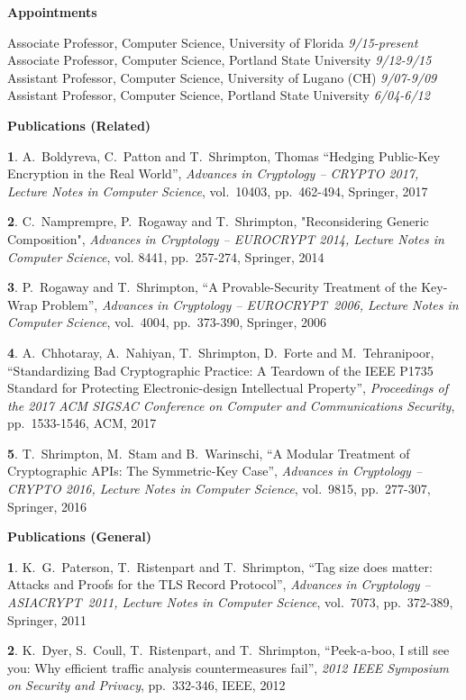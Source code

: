 \documentclass{article}[11pt]
\newcommand{\drop}{\protect{\vspace{1.2ex}}}
\newlength{\headwidth}
\newlength{\sepwidth}
\newlength{\itemwidth}
\newcommand{\resitem}[2]{\noindent\vspace{.15in}\parbox[t]{\headwidth}{\bf{#1}}\hspace{\sepwidth}\parbox[t]{\itemwidth}{#2}}
\newcommand{\pf}{\it}
\begin{document}
\begin{noindent}
\newcommand{\num}[1]{{\textbf{#1}.}}

\vspace{-2ex}

\resitem{Appointments}
{
Associate Professor, Computer Science, University of Florida
\hfill {\it 9/15-present}\\
Associate Professor, Computer Science, Portland State University
\hfill {\it 9/12-9/15}\\
Assistant Professor, Computer Science, University of Lugano (CH)
\hfill {\it 9/07-9/09} \\
Assistant Professor, Computer Science, Portland State University
\hfill {\it 6/04-6/12}
}

\resitem{Publications (Related)}
{
\num{1}
A.\ Boldyreva, C.\ Patton and T.\ Shrimpton, Thomas ``Hedging Public-Key Encryption in the Real World'',
{\pf Advances in Cryptology -- CRYPTO 2017, Lecture Notes in Computer
  Science}, vol.\ 10403, pp.\ 462-494, Springer, 2017

\drop
\num{2}
C.\ Namprempre, P.\ Rogaway and T.\ Shrimpton, "Reconsidering Generic Composition",
 {\pf Advances in Cryptology -- EUROCRYPT 2014, Lecture Notes in
   Computer Science}, vol. 8441, pp.\ 257-274, Springer, 2014


\drop
\num{3}
P.\ Rogaway and T.\ Shrimpton, ``A Provable-Security Treatment of the
Key-Wrap Problem'', {\pf Advances in Cryptology -- EUROCRYPT~2006,
Lecture Notes in Computer Science}, vol.\ 4004, pp.\ 373-390,
Springer, 2006

\drop
\num{4}
A.\ Chhotaray, A.\ Nahiyan, T.\ Shrimpton, D.\ Forte and M.\
Tehranipoor, ``Standardizing Bad Cryptographic Practice: {A} Teardown of the {IEEE
    P1735} Standard for Protecting Electronic-design Intellectual Property'',
 {\pf Proceedings of the 2017 ACM SIGSAC Conference on Computer and
    Communications Security}, pp.\ 1533-1546, ACM, 2017

\drop
\num{5}
T.\ Shrimpton, M.\ Stam and B.\ Warinschi,
``A Modular Treatment of Cryptographic APIs: The Symmetric-Key Case'',
{\pf Advances in Cryptology -- CRYPTO 2016, Lecture Notes in Computer
  Science}, vol.\ 9815, pp.\ 277-307, Springer, 2016
}


\resitem{Publications (General)}{
\num{1}
K.\ G.\ Paterson, T.\ Ristenpart and T.\ Shrimpton,
``Tag size does matter: Attacks and Proofs for the TLS Record
Protocol'',
{\pf Advances in Cryptology -- ASIACRYPT~2011, Lecture Notes in
  Computer Science},
vol.\ 7073,
pp.\ 372-389,
Springer, 2011

\drop
\num{2}
K.\ Dyer, S.\ Coull, T.\ Ristenpart, and T.\ Shrimpton, ``Peek-a-boo,
I still see you: Why efficient traffic analysis countermeasures
fail'', {\pf 2012 IEEE Symposium on
  Security and Privacy}, pp.\ 332-346, IEEE, 2012

}
\end{noindent}
\end{document}

